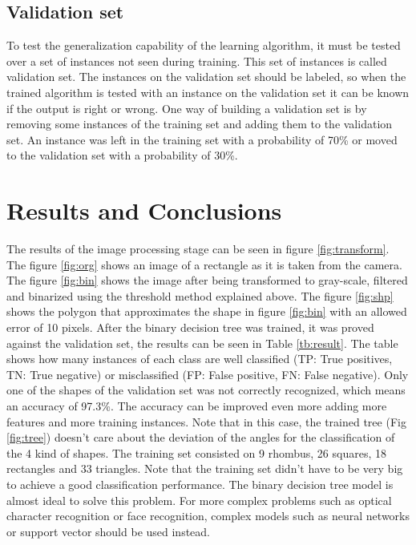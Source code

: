 \documentclass[10pt,journal]{IEEEtran}
\begin{document}
	\subsection{Validation set}
	To test the generalization capability of the learning algorithm, it must be
	tested over a set of instances not seen during training. This set of instances is
	called validation set. The instances on the validation set should be labeled, so when
	the trained algorithm is tested with an instance on the validation set it can be known if
	the output is right or wrong.\newline
	One way of building a validation set is by removing some instances of the training set
	and adding them to the validation set. An instance was left in the training set with a
	probability of 70\% or moved to the validation set with a probability of 30\%.
	
	\section{Results and Conclusions}
	The results of the image processing stage can be seen in figure \ref{fig:transform}. The
	figure \ref{fig:org} shows an image of a rectangle as it is taken from the camera. The 
	figure \ref{fig:bin} shows the image after being transformed to gray-scale, filtered and 
	binarized using	the threshold method explained above. The figure \ref{fig:shp} shows the
	polygon that approximates the shape in figure \ref{fig:bin} with an allowed error of 10
	pixels.\newline
	After the binary decision tree was trained, it was proved against the validation set,
	the results can be seen in Table \ref{tb:result}. The table shows how many instances
	of each class are well classified (TP: True positives, TN: True negative) or
	misclassified (FP: False positive, FN: False negative).
	Only one of the shapes of the validation set
	was not correctly recognized, which means an accuracy of 97.3\%. The accuracy can
	be improved even more adding more features and more training instances. 
	Note that in this case, the trained tree (Fig \ref{fig:tree}) doesn't care about the 
	deviation of the angles for the classification of the 4 kind of shapes.\newline
	The training set consisted on 9 rhombus, 26 squares, 18 rectangles and 33 triangles. Note
	that the training set didn't have to be very big to achieve a good classification performance.
	The binary decision tree model is almost ideal to solve this problem. For
	more complex problems such as optical character recognition or face recognition,
	complex models such as neural networks or support vector should be used instead.
	
\end{document}
